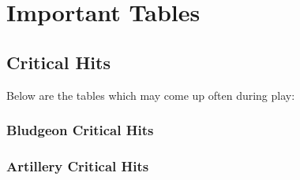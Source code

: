 \appendix
\chapter{Important Tables}
\label{ap:important-tables}
\section{Critical Hits}
\label{critical-hits}
Below are the tables which may come up often during play:
\subsection{Bludgeon Critical Hits}
\label{critical-hits-bludgeon}
\subsection{Artillery Critical Hits}
\label{critical-hits-artillery}



